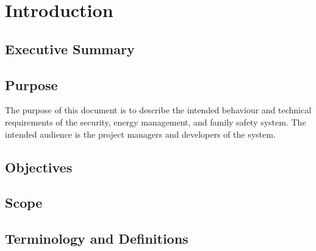 \documentclass{report}
\begin{document}

\tableofcontents
\listoffigures

\chapter{Introduction}
\section{Executive Summary}

\section{Purpose}
The purpose of this document is to describe the intended behaviour and
technical requirements of the security, energy management, and family safety
system.
The intended audience is the project managers and developers of the system.

\section{Objectives}


\section{Scope}


\section{Terminology and Definitions}
\end{document}
